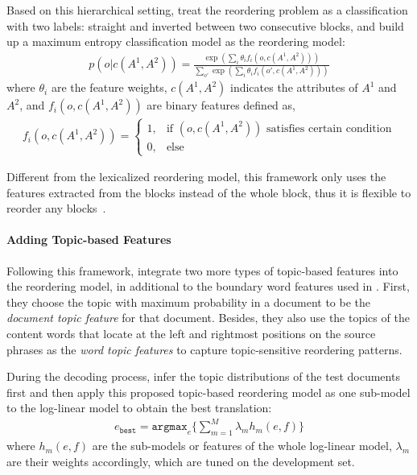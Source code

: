 Based on this hierarchical setting, \citet{Xiong-2006} treat the reordering problem as a classification with two labels: straight and inverted between two consecutive blocks, and build up a maximum entropy classification model as the reordering model:
\begin{align}
p(o|c(A^1, A^2)) = \frac{\exp(\sum_i \theta_i f_i(o, c(A^1, A^2)))}{\sum_{o'} \exp(\sum_i \theta_i f_i(o', c(A^1, A^2)))}
\end{align}
where $\theta_i$ are the feature weights, $c(A^1, A^2)$ indicates the attributes of $A^1$ and $A^2$, and $f_i(o, c(A^1, A^2))$ are binary features defined as,
\begin{align}
f_i(o, c(A^1,A^2)) = \begin{cases}
1, &\text{if $(o,c(A^1, A^2))$ satisfies certain condition} \\
0, &\text{else}
\end{cases}
\end{align}

Different from the lexicalized reordering model, this framework only uses the features extracted from the blocks instead of the whole block, thus it is flexible to reorder any blocks~\citep{Xiong-2006}. 

\paragraph{Adding Topic-based Features}

Following this framework, \citet{wang-14} integrate two more types of topic-based features into the reordering model, in additional to the boundary word features used in \citet{Xiong-2006}. First, they choose the topic with maximum probability in a document to be the \textit{document topic feature} for that document. Besides, they also use the topics of the content words that locate at the left and rightmost positions on the source phrases as the \textit{word topic features} to capture topic-sensitive reordering patterns. 

During the decoding process, \citet{Xiong-2006} infer the topic distributions of the test documents first and then apply this proposed topic-based reordering model as one sub-model to the log-linear model to obtain the best translation:
\begin{align}
e_\texttt{best} = \texttt{argmax}_e \Big \{ \sum_{m=1}^M \lambda_m h_m(e,f) \Big \}
\end{align}
where $h_m(e,f)$ are the  sub-models or features of the whole log-linear model, $\lambda_m$ are their weights accordingly, which are tuned on the development set.

